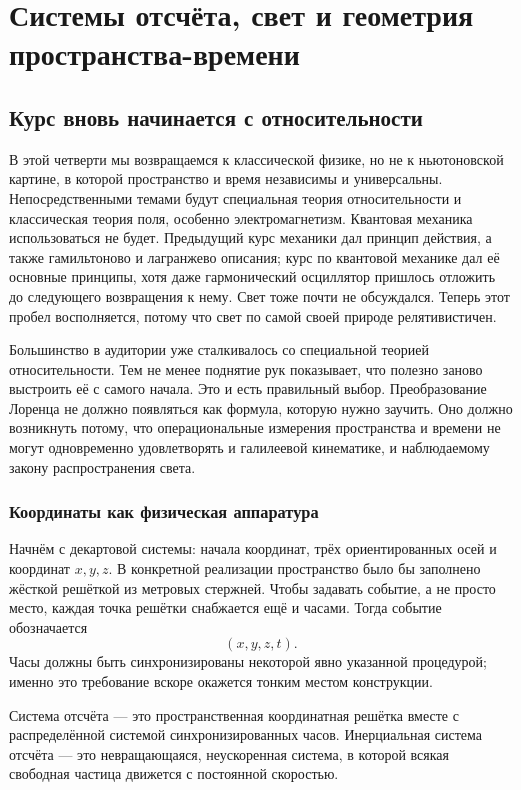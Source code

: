 \chapter{Системы отсчёта, свет и геометрия пространства-времени}

\section{Курс вновь начинается с относительности}

В этой четверти мы возвращаемся к классической физике, но не к ньютоновской картине, в которой пространство и время независимы и универсальны. Непосредственными темами будут специальная теория относительности и классическая теория поля, особенно электромагнетизм. Квантовая механика использоваться не будет. Предыдущий курс механики дал принцип действия, а также гамильтоново и лагранжево описания; курс по квантовой механике дал её основные принципы, хотя даже гармонический осциллятор пришлось отложить до следующего возвращения к нему. Свет тоже почти не обсуждался. Теперь этот пробел восполняется, потому что свет по самой своей природе релятивистичен.

Большинство в аудитории уже сталкивалось со специальной теорией относительности. Тем не менее поднятие рук показывает, что полезно заново выстроить её с самого начала. Это и есть правильный выбор. Преобразование Лоренца не должно появляться как формула, которую нужно заучить. Оно должно возникнуть потому, что операциональные измерения пространства и времени не могут одновременно удовлетворять и галилеевой кинематике, и наблюдаемому закону распространения света.

\subsection{Координаты как физическая аппаратура}

Начнём с декартовой системы: начала координат, трёх ориентированных осей и координат \(x,y,z\). В конкретной реализации пространство было бы заполнено жёсткой решёткой из метровых стержней. Чтобы задавать событие, а не просто место, каждая точка решётки снабжается ещё и часами. Тогда событие обозначается
\begin{equation}
(x,y,z,t).
\end{equation}
Часы должны быть синхронизированы некоторой явно указанной процедурой; именно это требование вскоре окажется тонким местом конструкции.

\begin{definition}
Система отсчёта — это пространственная координатная решётка вместе с распределённой системой синхронизированных часов. Инерциальная система отсчёта — это невращающаяся, неускоренная система, в которой всякая свободная частица движется с постоянной скоростью.
\end{definition}

